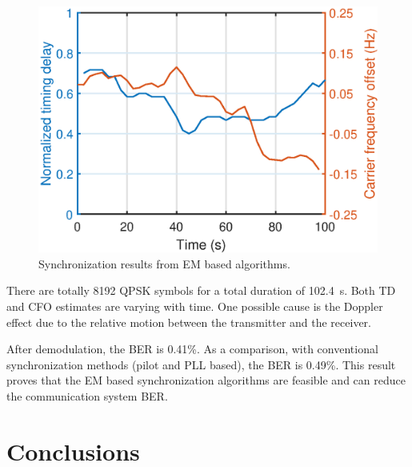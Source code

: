 \documentclass[journal,comsoc]{IEEEtran}
\begin{document}
\begin{figure}[ht]
\centering
\includegraphics[width=3 in]{pic/per_exp.eps}
\caption{Synchronization results from EM based algorithms.}
\label{fig:per_exp} 
\end{figure} 

There are totally 8192 QPSK symbols for a total duration of 102.4~s.
Both TD and CFO estimates are varying with time.
One possible cause is the Doppler effect due to the relative motion between the transmitter and the receiver.

After demodulation, the BER is 0.41\%.
As a comparison, with conventional synchronization methods (pilot and PLL based), the BER is 0.49\%.
This result proves that the EM based synchronization algorithms are feasible and can reduce the communication system BER.



\section{Conclusions}
\label{sec:conc}




\end{document}
